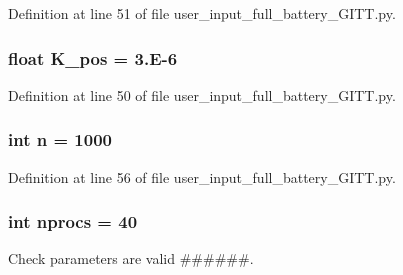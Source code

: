 Definition at line 51 of file user\-\_\-input\-\_\-full\-\_\-battery\-\_\-\-G\-I\-T\-T.\-py.

\hypertarget{namespaceuser__input__full__battery___g_i_t_t_ab1a8ebec490ba1301f818bd1c5f1f3fa}{
\subsubsection[{K\-\_\-pos}]{\setlength{\rightskip}{0pt plus 5cm}float K\-\_\-pos = 3.\-E-\/6}}\label{namespaceuser__input__full__battery___g_i_t_t_ab1a8ebec490ba1301f818bd1c5f1f3fa}


Definition at line 50 of file user\-\_\-input\-\_\-full\-\_\-battery\-\_\-\-G\-I\-T\-T.\-py.

\hypertarget{namespaceuser__input__full__battery___g_i_t_t_a76f11d9a0a47b94f72c2d0e77fb32240}{
\subsubsection[{n}]{\setlength{\rightskip}{0pt plus 5cm}int n = 1000}}\label{namespaceuser__input__full__battery___g_i_t_t_a76f11d9a0a47b94f72c2d0e77fb32240}


Definition at line 56 of file user\-\_\-input\-\_\-full\-\_\-battery\-\_\-\-G\-I\-T\-T.\-py.

\hypertarget{namespaceuser__input__full__battery___g_i_t_t_ad7c4c17cf720ee538e27c02ab356ed6b}{
\subsubsection[{nprocs}]{\setlength{\rightskip}{0pt plus 5cm}int nprocs = 40}}\label{namespaceuser__input__full__battery___g_i_t_t_ad7c4c17cf720ee538e27c02ab356ed6b}


Check parameters are valid \#\#\#\#\#\#. 


